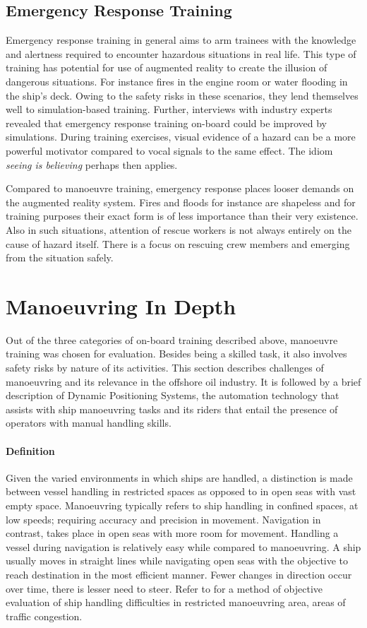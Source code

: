 \subsection{Emergency Response Training}

Emergency response training in general aims to arm trainees with the knowledge and alertness required to encounter hazardous situations in real life. This type of training has potential for use of augmented reality to create the illusion of dangerous situations. For instance fires in the engine room or water flooding in the ship's deck. Owing to the safety risks in these scenarios, they lend themselves well to simulation-based training. Further, interviews with industry experts revealed that emergency response training on-board could be improved by simulations. During training exercises, visual evidence of a hazard can be a more powerful motivator compared to vocal signals to the same effect. The idiom \textit{seeing is believing} perhaps then applies.

Compared to manoeuvre training, emergency response places looser demands on the augmented reality system. Fires and floods for instance are shapeless and for training purposes their exact form is of less importance than their very existence. Also in such situations, attention of rescue workers is not always entirely on the cause of hazard itself. There is a focus on rescuing crew members and emerging from the situation safely. 

\section{Manoeuvring In Depth}
Out of the three categories of on-board training described above, manoeuvre training was chosen for evaluation. Besides being a skilled task, it also involves safety risks by nature of its activities. This section describes challenges of manoeuvring and its relevance in the offshore oil industry. It is followed by a brief description of Dynamic Positioning Systems, the automation technology that assists with ship manoeuvring tasks and its riders that entail the presence of operators with manual handling skills. 

\paragraph{Definition}
\label{sec:shiphandling}
Given the varied environments in which ships are handled, a distinction is made between vessel handling in restricted spaces as opposed to in open seas with vast empty space. Manoeuvring typically refers to ship handling in confined spaces, at low speeds; requiring accuracy and precision in movement. Navigation in contrast, takes place in open seas with more room for movement. Handling a vessel during navigation is relatively easy while compared to manoeuvring. A ship usually moves in straight lines while navigating open seas with the objective to reach destination in the most efficient manner. Fewer changes in direction occur over time, there is lesser need to steer. Refer to \cite{inoue2000evaluation} for a method of objective evaluation of ship handling difficulties in restricted manoeuvring area, areas of traffic congestion.

